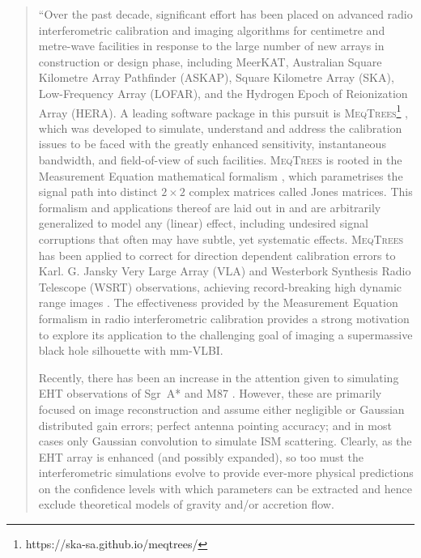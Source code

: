 \begin{quotation}
``Over the past decade, significant effort has been placed on advanced radio interferometric calibration and imaging algorithms for centimetre and metre-wave facilities in response to the large number of new arrays in construction or design phase, including MeerKAT, Australian Square Kilometre Array Pathfinder (ASKAP), Square Kilometre Array (SKA), Low-Frequency Array (LOFAR), and the Hydrogen Epoch of Reionization Array (HERA). A leading software package in this pursuit is \textsc{MeqTrees}\footnote{https://ska-sa.github.io/meqtrees/} \citep*{Noordam_2010}, which was developed to simulate, understand and address the calibration issues to be faced with the greatly enhanced sensitivity, instantaneous bandwidth, and field-of-view of such facilities. \textsc{MeqTrees} is rooted in the Measurement Equation mathematical formalism \citep{Hamaker_1996}, which parametrises the signal path into distinct $2 \times 2$ complex  matrices called Jones matrices. This formalism and applications thereof are laid out in \citep{Smirnov_2011a,Smirnov_2011b,Smirnov_2011c} and are arbitrarily generalized to model any (linear) effect, including undesired signal corruptions that often may have subtle, yet systematic effects. \textsc{MeqTrees} has been applied to correct for direction dependent calibration errors to Karl. G. Jansky Very Large Array (VLA) and Westerbork Synthesis Radio Telescope (WSRT) observations, achieving record-breaking high dynamic range images \citep[][Makhathini et al, in prep.]{Smirnov_2011c}. The effectiveness provided by the Measurement Equation formalism in radio interferometric calibration provides a strong motivation to explore its application to the challenging goal of imaging a supermassive black hole silhouette with mm-VLBI.


Recently, there has been an increase in the attention given to simulating EHT observations of Sgr~A*  and M87 \citep{Lu_2011,Fish_2014,Lu_2014,Bouman_2015,Lu_2016,Chael_2016}. However, these are primarily focused on image reconstruction and assume either negligible or Gaussian distributed gain errors; perfect antenna pointing accuracy; and in most cases only Gaussian convolution to simulate ISM scattering. Clearly, as the EHT array is enhanced (and possibly expanded), so too must the interferometric simulations evolve to provide ever-more physical predictions on the confidence levels with which parameters can be extracted and hence exclude theoretical models of gravity and/or accretion flow.



\end{quotation}
